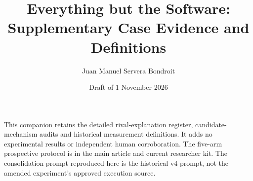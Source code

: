 \documentclass[11pt,a4paper]{article}
\title{Everything but the Software:\\Supplementary Case Evidence and Definitions}
\author{Juan Manuel Servera Bondroit}
\date{Draft of 1 November 2026}
\begin{document}
\maketitle
This companion retains the detailed rival-explanation register,
candidate-mechanism audits and historical measurement definitions.
It adds no experimental results or independent human corroboration.
The five-arm prospective protocol is in the main article and current
researcher kit. The consolidation prompt reproduced here is the
historical v4 prompt, not the amended experiment's approved execution source.

\appendix




\end{document}
